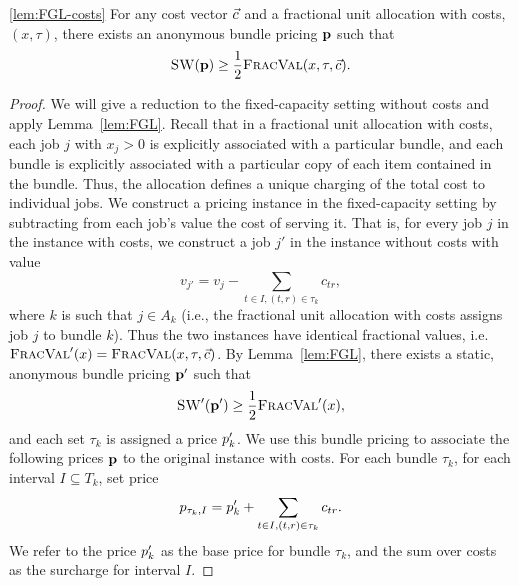 \begin{numberedlemma}{\ref{lem:FGL-costs}}
    For any cost vector $\vec{c}$ and a fractional unit allocation with
    costs, $(x,\tau)$, there exists an anonymous bundle pricing
    $\mathbf{p}$ such that
    \[
        {\normalfont\textsc{SW}}(\mathbf{p}) \ge \frac12 {\normalfont\textsc{FracVal}}(x,\tau,\vec{c}).
    \]
\end{numberedlemma}
\begin{proof}
    We will give a reduction to the fixed-capacity setting without costs and
    apply Lemma~\ref{lem:FGL}.  Recall that in a fractional unit allocation
    with costs, each job $j$ with $x_j > 0$ is explicitly associated with a
    particular bundle, and each bundle is explicitly associated with a
    particular copy of each item contained in the bundle.  Thus, the allocation
    defines a unique charging of the total cost to individual jobs. We
    construct a pricing instance in the fixed-capacity setting by subtracting
    from each job's value the cost of serving it. That is, for every job $j$ in
    the instance with costs, we construct a job $j'$ in the instance without
    costs with value 
    \begin{equation*}
        v_{j'}=v_j-\sum_{t\in I, (t,r)\in \tau_k}c_{tr},
    \end{equation*}
    where $k$ is such that $j \in A_k$ (i.e., the fractional unit allocation
    with costs assigns job $j$ to bundle $k$).  Thus the two instances have
    identical fractional values, i.e.  ${\normalfont\textsc{FracVal}}'(x)={\normalfont\textsc{FracVal}}(x,\tau,\vec{c})$. By
    Lemma~\ref{lem:FGL}, there exists a static, anonymous bundle pricing
    $\mathbf{p}'$ such that
    \begin{equation*}
        {\normalfont\textsc{SW}}'(\mathbf{p}') \ge \frac12 {\normalfont\textsc{FracVal}}'(x),
    \end{equation*}
    and each set $\tau_k$ is assigned a price $\price'_k$. We use this bundle
    pricing to associate the following prices $\mathbf{p}$ to the original
    instance with costs. For each bundle $\tau_k$, for each interval $I
    \subseteq T_k$, set price
    \[
        \price_{\tau_k,I} = \price'_k + \sum_{t\in I, (t,r)\in \tau_k} c_{tr}.
    \]
    We refer to the price $\price'_k$ as the base price for bundle $\tau_k$,
    and the sum over costs as the surcharge for interval $I$.


\end{proof}
